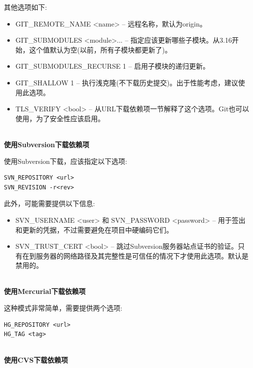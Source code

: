 其他选项如下:

\begin{itemize}
\item 
GIT\_REMOTE\_NAME <name> – 远程名称，默认为origin。

\item 
GIT\_SUBMODULES <module>... – 指定应该更新哪些子模块。从3.16开始，这个值默认为空(以前，所有子模块都更新了)。

\item 
GIT\_SUBMODULES\_RECURSE 1 – 启用子模块的递归更新。

\item 
GIT\_SHALLOW 1 – 执行浅克隆(不下载历史提交)。出于性能考虑，建议使用此选项。

\item 
TLS\_VERIFY <bool> – 从URL下载依赖项一节解释了这个选项。Git也可以使用，为了安全性应该启用。
\end{itemize}

\hspace*{\fill} \\ %
\noindent
\textbf{使用Subversion下载依赖项}

使用Subversion下载，应该指定以下选项:

\begin{lstlisting}[style=styleCMake]
SVN_REPOSITORY <url>
SVN_REVISION -r<rev>
\end{lstlisting} 

此外，可能需要提供以下信息:

\begin{itemize}
\item 
SVN\_USERNAME <user> 和 SVN\_PASSWORD <password> – 用于签出和更新的凭据，不过需要避免在项目中硬编码它们。
	
\item 
SVN\_TRUST\_CERT <bool> – 跳过Subversion服务器站点证书的验证。只有在到服务器的网络路径及其完整性是可信任的情况下才使用此选项。默认是禁用的。
\end{itemize}

\hspace*{\fill} \\ %
\noindent
\textbf{使用Mercurial下载依赖项}

这种模式非常简单，需要提供两个选项:

\begin{lstlisting}[style=styleCMake]
HG_REPOSITORY <url>
HG_TAG <tag>
\end{lstlisting} 

\hspace*{\fill} \\ %
\noindent
\textbf{使用CVS下载依赖项}

